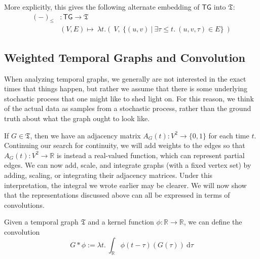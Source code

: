 \documentclass{article}
\theoremstyle{definition}
\begin{document}
	More explicitly, this gives the following alternate embedding of $\mathsf{TG}$ into $\mathfrak T$:
	\begin{align*}
	(-)_{\leq}&: \mathsf{TG} \to \mathfrak T \\
	&(V, E) \mapsto ~\lambda t.\left( ~V,~\Big\{ (u,v)~\Big|~\exists \tau \leq t.~(u,v,\tau)\in E \Big\}~\right)
	\end{align*}
	
	
	
	\subsection{Weighted Temporal Graphs and Convolution}
	When analyzing temporal graphs, we generally are not interested in the exact times that things happen, but rather we assume that there is some underlying stochastic process that one might like to shed light on. For this reason, we think of the actual data as samples from a stochastic process, rather than the ground truth about what the graph ought to look like.
	
	
	If $G \in \mathfrak T$, then we have an adjacency matrix $A_G(t) : V^2 \to \{0,1\}$ for each time $t$. Continuing our search for continuity, we will add weights to the edges so that $A_G(t) : V^2 \to \mathbb R$ is instead a real-valued function, which can represent partial edges. We can now add, scale, and integrate graphs (with a fixed vertex set) by adding, scaling, or integrating their adjacency matrices.
	Under this interpretation, the integral we wrote earlier may be clearer. We will now show that the representations discussed above can all be expressed in terms of convolutions.
	
	Given a temporal graph $\mathfrak T$ and a kernel function $\phi: \mathbb R \to \mathbb R$, we can define the convolution
	\begin{equation*}
		G \ast \phi := \lambda t.~\int_{\mathbb R}  \phi(t - \tau)(G(\tau))~\mathrm d \tau
	\end{equation*}
	
\end{document}
